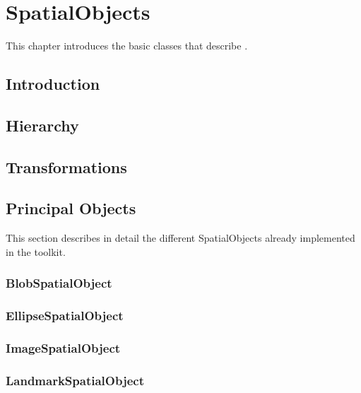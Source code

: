 
\chapter{SpatialObjects}
\label{sec:SpatialObjects}

This chapter introduces the basic classes that describe .

\section{Introduction}
\label{Introduction}


\section{Hierarchy}
\label{sec:SpatialObjectHierarchy}
\ifitkFullVersion 

\fi 


\section{Transformations}
\label{sec:SpatialObjectTransforms}
\ifitkFullVersion 

\fi

\section{Principal Objects}
\label{sec:Principal Objects}
This section describes in detail the different SpatialObjects already implemented in the toolkit.

\subsection{BlobSpatialObject}
\label{sec:BlobSpatialObject}
\ifitkFullVersion 

\fi

\subsection{EllipseSpatialObject}
\label{sec:EllipseSpatialObject}
\ifitkFullVersion 

\fi

\subsection{ImageSpatialObject}
\label{sec:ImageSpatialObject}
\ifitkFullVersion 

\fi

\subsection{LandmarkSpatialObject}
\label{sec:LandmarkSpatialObject}
\ifitkFullVersion 

\fi

